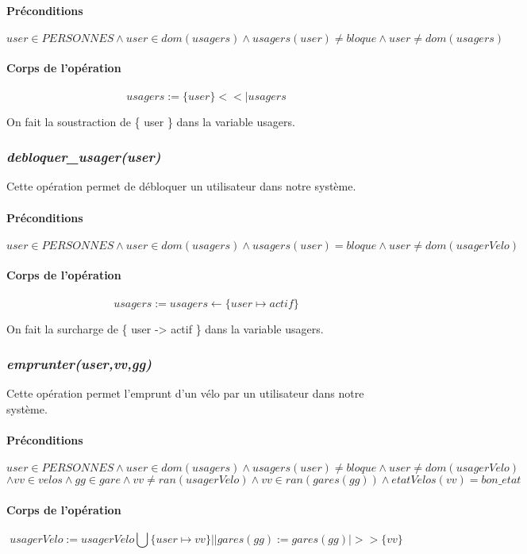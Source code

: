 \documentclass[12pt]{article}
\begin{document}
\paragraph{Préconditions}
\[user \in PERSONNES \land user \in dom(usagers) \land usagers(user) \neq bloque \land user \neq dom(usagers) \]

\paragraph{Corps de l'opération}
\[ usagers := \{ user \} <<| usagers \]

On fait la soustraction de \{ user \} dans la variable usagers.

\subsubsection{\textit{debloquer\_usager(user)}}
Cette opération permet de débloquer un utilisateur dans notre système.
\paragraph{Préconditions}
\[ user \in PERSONNES \land user \in dom(usagers) \land usagers(user) = bloque \land user \neq dom(usagerVelo) \]

\paragraph{Corps de l'opération}
\[usagers := usagers \leftarrow \{user \mapsto actif\} \]

On fait la surcharge de \{ user -> actif \} dans la variable usagers.
\subsubsection{\textit{emprunter(user,vv,gg)}}
Cette opération permet l'emprunt d'un vélo par un utilisateur dans notre système.
\paragraph{Préconditions}
\[ user \in PERSONNES \land user \in dom(usagers) \land usagers(user) \neq bloque \land user \neq dom(usagerVelo) \]\[\land vv \in velos \land gg \in gare \land vv \neq ran(usagerVelo) \land vv \in ran(gares(gg)) \land etatVelos(vv) = bon\_etat\]
\paragraph{Corps de l'opération}
	\[ usagerVelo := usagerVelo \bigcup \{user \mapsto vv\} ||
gares(gg) := gares(gg) |>> \{vv\}\]
\end{document}
